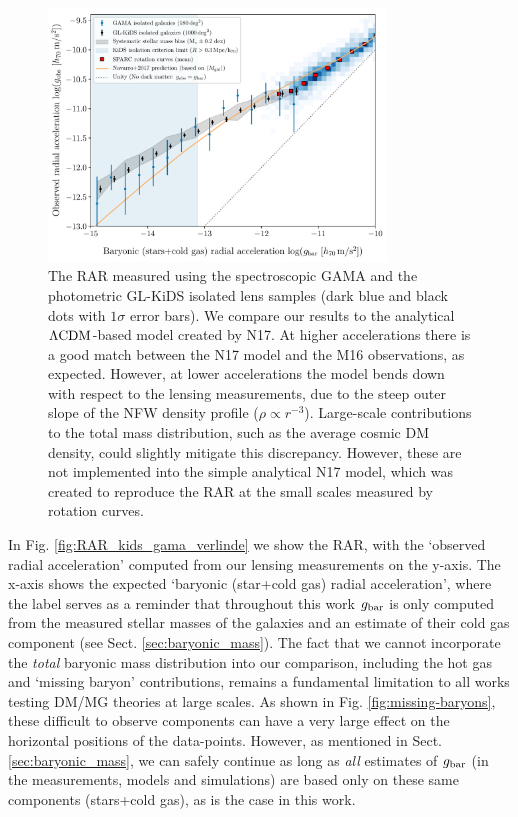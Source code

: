 \documentclass[usenatbib]{mnras}
\newcommand{\lcdm}{{\rm \Lambda CDM}}
\newcommand{\un}[1]{_{\rm #1}}
\begin{document}
\begin{figure}
	\includegraphics[width=0.8\textwidth]{Figures/RAR_KiDS+GAMA+Navarro_Nobins_isolated.pdf}
	\caption{The RAR measured using the spectroscopic GAMA and the photometric GL-KiDS isolated lens samples (dark blue and black dots with $1\sigma$ error bars). We compare our results to the analytical $\lcdm$-based model created by N17. At higher accelerations there is a good match between the N17 model and the M16 observations, as expected. However, at lower accelerations the model bends down with respect to the lensing measurements, due to the steep outer slope of the NFW density profile ($\rho \propto r^{-3}$). Large-scale contributions to the total mass distribution, such as the average cosmic DM density, could slightly mitigate this discrepancy. However, these are not implemented into the simple analytical N17 model, which was created to reproduce the RAR at the small scales measured by rotation curves.}
	\label{fig:RAR_kids_gama_Navarro}
\end{figure}

In Fig. \ref{fig:RAR_kids_gama_verlinde} we show the RAR, with the `observed radial acceleration' computed from our lensing measurements on the y-axis. The x-axis shows the expected `baryonic (star+cold gas) radial acceleration', where the label serves as a reminder that throughout this work $g\un{bar}$ is only computed from the measured stellar masses of the galaxies and an estimate of their cold gas component (see Sect. \ref{sec:baryonic_mass}). The fact that we cannot incorporate the \emph{total} baryonic mass distribution into our comparison, including the hot gas and `missing baryon' contributions, remains a fundamental limitation to all works testing DM/MG theories at large scales. As shown in Fig. \ref{fig:missing-baryons}, these difficult to observe components can have a very large effect on the horizontal positions of the data-points. However, as mentioned in Sect. \ref{sec:baryonic_mass}, we can safely continue as long as \emph{all} estimates of $g\un{bar}$ (in the measurements, models and simulations) are based only on these same components (stars+cold gas), as is the case in this work.
\end{document}
